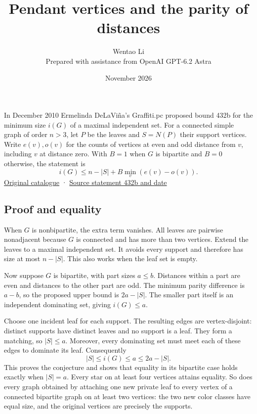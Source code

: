 \documentclass[11pt]{article}
\title{Pendant vertices and the parity of distances}
\author{Wentao Li\\\small Prepared with assistance from OpenAI GPT-6.2 Astra}
\date{November 2026}
\begin{document}
\maketitle
In December 2010 Ermelinda DeLaViña's Graffiti.pc proposed bound 432b for the minimum size \(i(G)\) of a maximal independent set. For a connected simple graph of order \(n>3\), let \(P\) be the leaves and \(S=N(P)\) their support vertices. Write \(e(v),o(v)\) for the counts of vertices at even and odd distance from \(v\), including \(v\) at distance zero. With \(B=1\) when \(G\) is bipartite and \(B=0\) otherwise, the statement is
\[i(G)\le n-|S|+B\min_v(e(v)-o(v)).\]
\href{https://www.uhd.edu/academics/sciences/mathematics-statistics/wowii/index.html}{Original catalogue} · \href{https://www.uhd.edu/academics/sciences/mathematics-statistics/wowii/files/conjectures.json}{Source statement 432b and date}

\subsection{Proof and equality}\label{proof-and-equality}

When \(G\) is nonbipartite, the extra term vanishes. All leaves are pairwise nonadjacent because \(G\) is connected and has more than two vertices. Extend the leaves to a maximal independent set. It avoids every support and therefore has size at most \(n-|S|\). This also works when the leaf set is empty.

Now suppose \(G\) is bipartite, with part sizes \(a\le b\). Distances within a part are even and distances to the other part are odd. The minimum parity difference is \(a-b\), so the proposed upper bound is \(2a-|S|\). The smaller part itself is an independent dominating set, giving \(i(G)\le a\).

Choose one incident leaf for each support. The resulting edges are vertex-disjoint: distinct supports have distinct leaves and no support is a leaf. They form a matching, so \(|S|\le a\). Moreover, every dominating set must meet each of these edges to dominate its leaf. Consequently
\[|S|\le i(G)\le a\le 2a-|S|.\]
This proves the conjecture and shows that equality in its bipartite case holds exactly when \(|S|=a\). Every star on at least four vertices attains equality. So does every graph obtained by attaching one new private leaf to every vertex of a connected bipartite graph on at least two vertices: the two new color classes have equal size, and the original vertices are precisely the supports.
\end{document}
